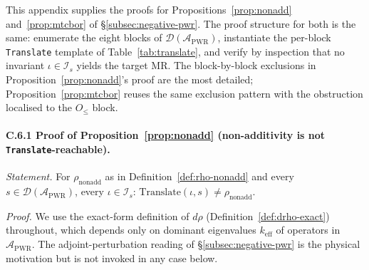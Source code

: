 \documentclass[manuscript]{acmart}
\begin{document}
This appendix supplies the proofs for Propositions~\ref{prop:nonadd} and~\ref{prop:mtcbor} of \S\ref{subsec:negative-pwr}. The proof structure for both is the same: enumerate the eight blocks of $\mathcal{D}(\mathcal{A}_{\mathrm{PWR}})$, instantiate the per-block \texttt{Translate} template of Table~\ref{tab:translate}, and verify by inspection that no invariant $\iota \in \mathcal{I}_{s}$ yields the target MR. The block-by-block exclusions in Proposition~\ref{prop:nonadd}'s proof are the most detailed; Proposition~\ref{prop:mtcbor} reuses the same exclusion pattern with the obstruction localised to the $O_{\le}$ block.

\paragraph{C.6.1 Proof of Proposition~\ref{prop:nonadd} (non-additivity is not \texttt{Translate}-reachable).}

\emph{Statement.} For $\rho_{\mathrm{nonadd}}$ as in Definition~\ref{def:rho-nonadd} and every $s \in \mathcal{D}(\mathcal{A}_{\mathrm{PWR}})$, every $\iota \in \mathcal{I}_{s}$: $\mathrm{Translate}(\iota, s) \neq \rho_{\mathrm{nonadd}}$.

\emph{Proof.} We use the exact-form definition of $d\rho$ (Definition~\ref{def:drho-exact}) throughout, which depends only on dominant eigenvalues $k_{\mathrm{eff}}$ of operators in $\mathcal{A}_{\mathrm{PWR}}$. The adjoint-perturbation reading of \S\ref{subsec:negative-pwr} is the physical motivation but is not invoked in any case below.
\end{document}
